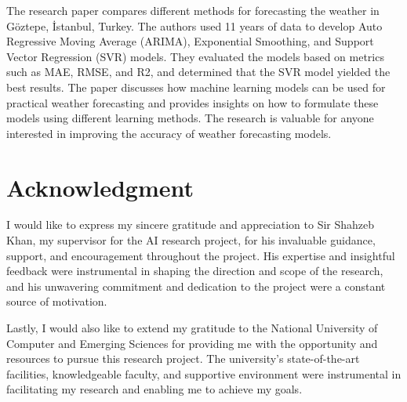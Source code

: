 \documentclass[conference,letterpaper]{IEEEtran}
\begin{document}
The research paper compares different methods for forecasting the weather in Göztepe, İstanbul, Turkey. The authors used 11 years of data to develop Auto Regressive Moving Average (ARIMA), Exponential Smoothing, and Support Vector Regression (SVR) models. They evaluated the models based on metrics such as MAE, RMSE, and R2, and determined that the SVR model yielded the best results. The paper discusses how machine learning models can be used for practical weather forecasting and provides insights on how to formulate these models using different learning methods. The research is valuable for anyone interested in improving the accuracy of weather forecasting models.

\section*{Acknowledgment}
I would like to express my sincere gratitude and appreciation to Sir Shahzeb Khan, my supervisor for the AI research project, for his invaluable guidance, support, and encouragement throughout the project. His expertise and insightful feedback were instrumental in shaping the direction and scope of the research, and his unwavering commitment and dedication to the project were a constant source of motivation.

Lastly, I would also like to extend my gratitude to the National University of Computer and Emerging Sciences for providing me with the opportunity and resources to pursue this research project. The university's state-of-the-art facilities, knowledgeable faculty, and supportive environment were instrumental in facilitating my research and enabling me to achieve my goals.



%
\end{document}
